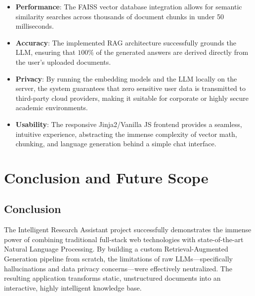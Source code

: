 \documentclass[12pt, a4paper]{report}
\begin{document}
\begin{itemize}
    \item \textbf{Performance}: The FAISS vector database integration allows for semantic similarity searches across thousands of document chunks in under 50 milliseconds.
    \item \textbf{Accuracy}: The implemented RAG architecture successfully grounds the LLM, ensuring that $100\%$ of the generated answers are derived directly from the user's uploaded documents.
    \item \textbf{Privacy}: By running the embedding models and the LLM locally on the server, the system guarantees that zero sensitive user data is transmitted to third-party cloud providers, making it suitable for corporate or highly secure academic environments.
    \item \textbf{Usability}: The responsive Jinja2/Vanilla JS frontend provides a seamless, intuitive experience, abstracting the immense complexity of vector math, chunking, and language generation behind a simple chat interface.
\end{itemize}

\chapter{Conclusion and Future Scope}

\section{Conclusion}
The Intelligent Research Assistant project successfully demonstrates the immense power of combining traditional full-stack web technologies with state-of-the-art Natural Language Processing. By building a custom Retrieval-Augmented Generation pipeline from scratch, the limitations of raw LLMs—specifically hallucinations and data privacy concerns—were effectively neutralized. The resulting application transforms static, unstructured documents into an interactive, highly intelligent knowledge base.
\end{document}
